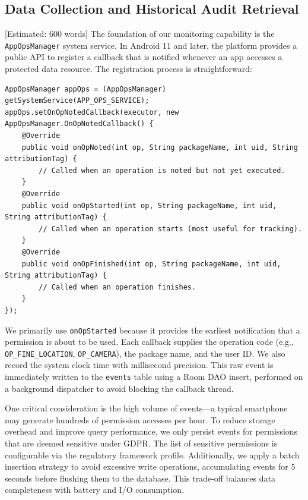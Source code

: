 \subsection{Data Collection and Historical Audit Retrieval} [Estimated: 600 words]
The foundation of our monitoring capability is the \texttt{AppOpsManager} system service. In Android 11 and later, the platform provides a public API to register a callback that is notified whenever an app accesses a protected data resource. The registration process is straightforward:

\begin{lstlisting}[caption=Registering the permission callback]
AppOpsManager appOps = (AppOpsManager) getSystemService(APP_OPS_SERVICE);
appOps.setOnOpNotedCallback(executor, new AppOpsManager.OnOpNotedCallback() {
    @Override
    public void onOpNoted(int op, String packageName, int uid, String attributionTag) {
        // Called when an operation is noted but not yet executed.
    }
    @Override
    public void onOpStarted(int op, String packageName, int uid, String attributionTag) {
        // Called when an operation starts (most useful for tracking).
    }
    @Override
    public void onOpFinished(int op, String packageName, int uid, String attributionTag) {
        // Called when an operation finishes.
    }
});
\end{lstlisting}

We primarily use \texttt{onOpStarted} because it provides the earliest notification that a permission is about to be used. Each callback supplies the operation code (e.g., \texttt{OP\_FINE\_LOCATION}, \texttt{OP\_CAMERA}), the package name, and the user ID. We also record the system clock time with millisecond precision. This raw event is immediately written to the \texttt{events} table using a Room DAO insert, performed on a background dispatcher to avoid blocking the callback thread.

One critical consideration is the high volume of events—a typical smartphone may generate hundreds of permission accesses per hour. To reduce storage overhead and improve query performance, we only persist events for permissions that are deemed sensitive under GDPR. The list of sensitive permissions is configurable via the regulatory framework profile. Additionally, we apply a batch insertion strategy to avoid excessive write operations, accumulating events for 5 seconds before flushing them to the database. This trade-off balances data completeness with battery and I/O consumption.


